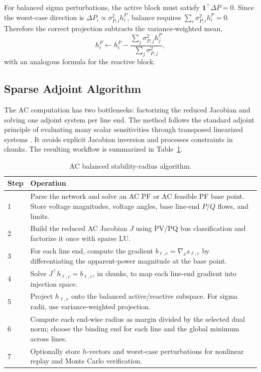 \documentclass[energies,article,submit,pdftex,moreauthors]{Definitions/mdpi}
\newcommand{\ones}{\mathbf{1}}
\begin{document}
For balanced sigma perturbations, the active block must satisfy $\ones^\top\Delta P=0$. Since the worst-case direction is $\Delta P_i\propto \sigma_{P,i}^2 h^P_i$, balance requires $\sum_i \sigma_{P,i}^2 h^P_i = 0$. Therefore the correct projection subtracts the variance-weighted mean,
\begin{equation}
  h_i^P \leftarrow h_i^P -
  \frac{\sum_j \sigma_{P,j}^2 h_j^P}{\sum_j\sigma_{P,j}^2},
\end{equation}
with an analogous formula for the reactive block.

\subsection{Sparse Adjoint Algorithm}

The AC computation has two bottlenecks: factorizing the reduced Jacobian and solving one adjoint system per line end. The method follows the standard adjoint principle of evaluating many scalar sensitivities through transposed linearized systems \citep{GilesPierce2000}. It avoids explicit Jacobian inversion and processes constraints in chunks. The resulting workflow is summarized in Table~\ref{tab:algorithm}.

\begin{table}[H]
\centering
\caption{AC balanced stability-radius algorithm.\label{tab:algorithm}}
\begin{tabularx}{\textwidth}{@{}lX@{}}
\toprule
Step & Operation \\
\midrule
1 & Parse the network and solve an AC PF or AC feasible PF base point. Store voltage magnitudes, voltage angles, base line-end $P/Q$ flows, and limits. \\
2 & Build the reduced AC Jacobian $J$ using PV/PQ bus classification and factorize it once with sparse LU. \\
3 & For each line end, compute the gradient $b_{\ell,e}=\nabla_x s_{\ell,e}$ by differentiating the apparent-power magnitude at the base point. \\
4 & Solve $J^\top h_{\ell,e}=b_{\ell,e}$, in chunks, to map each line-end gradient into injection space. \\
5 & Project $h_{\ell,e}$ onto the balanced active/reactive subspace. For sigma radii, use variance-weighted projection. \\
6 & Compute each end-wise radius as margin divided by the selected dual norm; choose the binding end for each line and the global minimum across lines. \\
7 & Optionally store $h$-vectors and worst-case perturbations for nonlinear replay and Monte Carlo verification. \\
\bottomrule
\end{tabularx}
\end{table}
\end{document}
